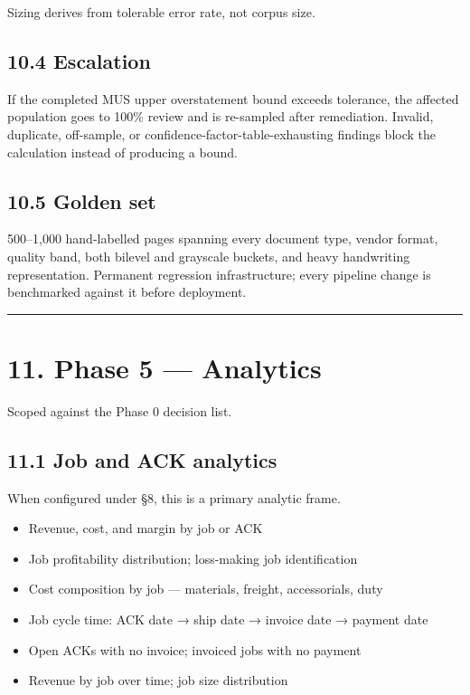 \documentclass[
]{article}
\providecommand{\tightlist}{%
  \setlength{\itemsep}{0pt}\setlength{\parskip}{0pt}}
\begin{document}
Sizing derives from tolerable error rate, not corpus size.

\subsection{10.4 Escalation}\label{escalation}

If the completed MUS upper overstatement bound exceeds tolerance, the
affected population goes to 100\% review and is re-sampled after
remediation. Invalid, duplicate, off-sample, or
confidence-factor-table-exhausting findings block the calculation
instead of producing a bound.

\subsection{10.5 Golden set}\label{golden-set}

500--1,000 hand-labelled pages spanning every document type, vendor
format, quality band, both bilevel and grayscale buckets, and heavy
handwriting representation. Permanent regression infrastructure; every
pipeline change is benchmarked against it before deployment.

\begin{center}\rule{0.5\linewidth}{0.5pt}\end{center}

\section{11. Phase 5 --- Analytics}\label{phase-5-analytics}

Scoped against the Phase 0 decision list.

\subsection{11.1 Job and ACK analytics}\label{job-and-ack-analytics}

When configured under §8, this is a primary analytic frame.

\begin{itemize}
\tightlist
\item
  Revenue, cost, and margin by job or ACK
\item
  Job profitability distribution; loss-making job identification
\item
  Cost composition by job --- materials, freight, accessorials, duty
\item
  Job cycle time: ACK date → ship date → invoice date → payment date
\item
  Open ACKs with no invoice; invoiced jobs with no payment
\item
  Revenue by job over time; job size distribution
\end{itemize}
\end{document}
